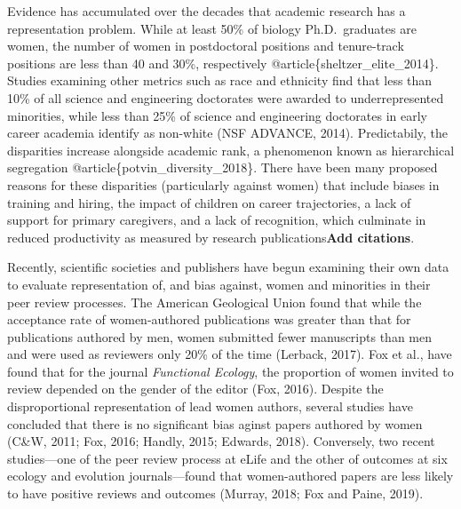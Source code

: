 \documentclass[11pt,]{article}
\begin{document}
Evidence has accumulated over the decades that academic research has a
representation problem. While at least 50\% of biology Ph.D.~graduates
are women, the number of women in postdoctoral positions and
tenure-track positions are less than 40 and 30\%, respectively
@article\{sheltzer\_elite\_2014\}. Studies examining other metrics such
as race and ethnicity find that less than 10\% of all science and
engineering doctorates were awarded to underrepresented minorities,
while less than 25\% of science and engineering doctorates in early
career academia identify as non-white (NSF ADVANCE, 2014). Predictabily,
the disparities increase alongside academic rank, a phenomenon known as
hierarchical segregation @article\{potvin\_diversity\_2018\}. There have
been many proposed reasons for these disparities (particularly against
women) that include biases in training and hiring, the impact of
children on career trajectories, a lack of support for primary
caregivers, and a lack of recognition, which culminate in reduced
productivity as measured by research publications\textbf{Add citations}.

Recently, scientific societies and publishers have begun examining their
own data to evaluate representation of, and bias against, women and
minorities in their peer review processes. The American Geological Union
found that while the acceptance rate of women-authored publications was
greater than that for publications authored by men, women submitted
fewer manuscripts than men and were used as reviewers only 20\% of the
time (Lerback, 2017). Fox et al., have found that for the journal
\emph{Functional Ecology}, the proportion of women invited to review
depended on the gender of the editor (Fox, 2016). Despite the
disproportional representation of lead women authors, several studies
have concluded that there is no significant bias aginst papers authored
by women (C\&W, 2011; Fox, 2016; Handly, 2015; Edwards, 2018).
Conversely, two recent studies---one of the peer review process at eLife
and the other of outcomes at six ecology and evolution journals---found
that women-authored papers are less likely to have positive reviews and
outcomes (Murray, 2018; Fox and Paine, 2019).
\end{document}

